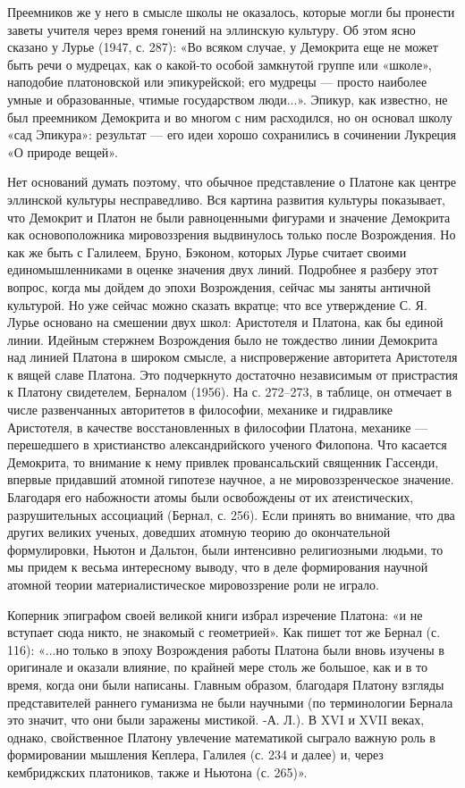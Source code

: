 Преемников же  у него в  смысле школы  не оказалось, которые  могли бы
пронести заветы учителя через время  гонений на эллинскую культуру. Об
этом  ясно  сказано  у  Лурье  (1947,  с.  287):  «Во  всяком  случае,
у  Демокрита  еще не  может  быть  речи  о  мудрецах, как  о  какой-то
особой  замкнутой  группе  или  «школе»,  наподобие  платоновской  или
эпикурейской; его  мудрецы ---  просто наиболее умные  и образованные,
чтимые государством люди...». Эпикур,  как известно, не был преемником
Демокрита  и во  многом с  ним расходился,  но он  основал школу  «сад
Эпикура»:  результат  ---  его  идеи хорошо  сохранились  в  сочинении
Лукреция «О природе вещей».

Нет оснований думать поэтому, что  обычное представление о Платоне как
центре эллинской культуры несправедливо. Вся картина развития культуры
показывает,  что  Демокрит  и  Платон не  были  равноценными  фигурами
и  значение Демокрита  как  основоположника мировоззрения  выдвинулось
только после Возрождения.  Но как же быть с  Галилеем, Бруно, Бэконом,
которых Лурье считает своими  единомышленниками в оценке значения двух
линий.  Подробнее я  разберу этот  вопрос,  когда мы  дойдем до  эпохи
Возрождения, сейчас мы заняты античной  культурой. Но уже сейчас можно
сказать вкратце; что все утверждение  С. Я. Лурье основано на смешении
двух школ: Аристотеля и Платона, как бы единой линии. Идейным стержнем
Возрождения было  не тождество  линии Демокрита  над линией  Платона в
широком смысле,  а ниспровержение авторитета Аристотеля  к вящей славе
Платона.  Это  подчеркнуто  достаточно независимым  от  пристрастия  к
Платону свидетелем,  Берналом (1956).  На с.  272--273, в  таблице, он
отмечает  в  числе  развенчанных  авторитетов  в  философии,  механике
и  гидравлике  Аристотеля,  в  качестве  восстановленных  в  философии
Платона,  механике  ---  перешедшего в  христианство  александрийского
ученого Филопона. Что  касается Демокрита, то внимание  к нему привлек
провансальский священник Гассенди,  впервые придавший атомной гипотезе
научное,  а не  мировоззренческое значение.  Благодаря его  набожности
атомы были освобождены от  их атеистических, разрушительных ассоциаций
(Бернал, с.  256). Если  принять во внимание,  что два  других великих
ученых, доведших атомную теорию  до окончательной формулировки, Ньютон
и Дальтон, были интенсивно религиозными  людьми, то мы придем к весьма
интересному  выводу, что  в деле  формирования научной  атомной теории
материалистическое мировоззрение роли не играло.

Коперник эпиграфом своей великой книги избрал изречение Платона: «и не
вступает  сюда никто,  не знакомый  с  геометрией». Как  пишет тот  же
Бернал (с. 116): «...но только в эпоху Возрождения работы Платона были
вновь изучены в оригинале и оказали  влияние, по крайней мере столь же
большое, как и  в то время, когда они были  написаны. Главным образом,
благодаря  Платону взгляды  представителей раннего  гуманизма не  были
научными (по  терминологии Бернала это  значит, что они  были заражены
мистикой. -А.  Л.). В XVI  и XVII веках, однако,  свойственное Платону
увлечение  математикой сыграло  важную  роль  в формировании  мышления
Кеплера, Галилея  (с. 234 и  далее) и, через  кембриджских платоников,
также и Ньютона (с. 265)».

